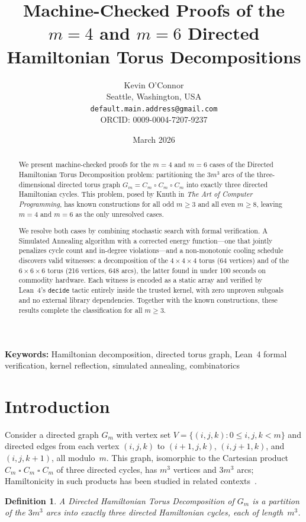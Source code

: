 \documentclass[11pt]{article}
\title{Machine-Checked Proofs of the $m=4$ and $m=6$
Directed Hamiltonian Torus Decompositions}
\author{
  Kevin O'Connor\\
  Seattle, Washington, USA\\
  \texttt{default.main.address@gmail.com}\\
  ORCID: 0009-0004-7207-9237
}
\date{March 2026}
\theoremstyle{plain}
\newtheorem{definition}{Definition}
\begin{document}
\maketitle

\begin{abstract}
We present machine-checked proofs for the $m=4$ and $m=6$ cases of the
Directed Hamiltonian Torus Decomposition problem: partitioning the $3m^3$ arcs
of the three-dimensional directed torus graph $G_m = C_m \mathbin{\square}
C_m \mathbin{\square} C_m$ into exactly three directed Hamiltonian cycles.
This problem, posed by Knuth in \emph{The Art of Computer Programming}, has
known constructions for all odd $m \geq 3$ and all even $m \geq 8$, leaving
$m = 4$ and $m = 6$ as the only unresolved cases.

We resolve both cases by combining stochastic search with formal verification.
A Simulated Annealing algorithm with a corrected energy function---one that
jointly penalizes cycle count and in-degree violations---and a non-monotonic
cooling schedule discovers valid witnesses: a decomposition of the
$4{\times}4{\times}4$ torus (64 vertices) and of the $6{\times}6{\times}6$
torus (216 vertices, 648 arcs), the latter found in under 100 seconds on
commodity hardware. Each witness is encoded as a static array and verified by
Lean~4's \texttt{decide} tactic entirely inside the trusted kernel, with zero
unproven subgoals and no external library dependencies. Together with the known
constructions, these results complete the classification for all $m \geq 3$.
\end{abstract}

\noindent\textbf{Keywords:} Hamiltonian decomposition, directed torus graph,
Lean~4 formal verification, kernel reflection, simulated annealing, combinatorics

\section{Introduction}

Consider a directed graph $G_m$ with vertex set
$V = \{(i, j, k) : 0 \le i, j, k < m\}$ and directed edges from each vertex
$(i,j,k)$ to $(i{+}1, j, k)$, $(i, j{+}1, k)$, and $(i, j, k{+}1)$, all
modulo~$m$. This graph, isomorphic to the Cartesian product
$C_m \mathbin{\square} C_m \mathbin{\square} C_m$ of three directed cycles,
has $m^3$ vertices and $3m^3$ arcs; Hamiltonicity in such products has
been studied in related contexts~\cite{darijani2025}.

\begin{definition}
A \emph{Directed Hamiltonian Torus Decomposition} of $G_m$ is a partition of
the $3m^3$ arcs into exactly three directed Hamiltonian cycles, each of
length~$m^3$.
\end{definition}
\end{document}
